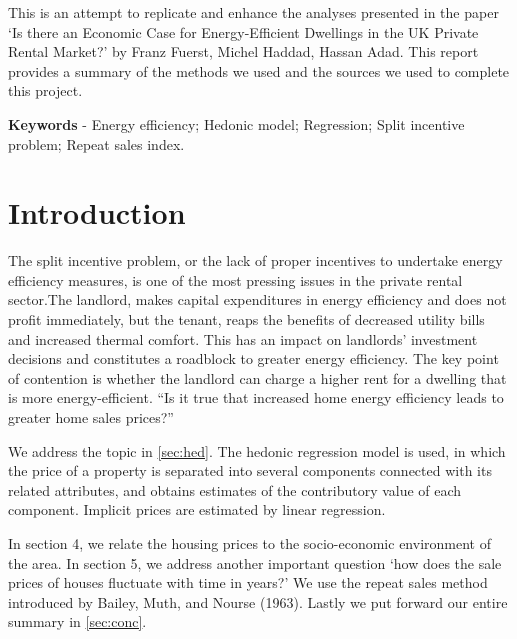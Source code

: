 \documentclass[12pt]{article}
\author{ABSTRACT}
\date{ }
\begin{document}
\setlength{\headheight}{14.49998pt}

\newpage

\maketitle

This is an attempt to replicate and enhance the analyses presented in the paper `Is there an Economic Case for Energy-Efficient Dwellings in the UK Private Rental Market?' by Franz Fuerst, Michel Haddad, Hassan Adad. This report provides a summary of the methods we used and the sources we used to complete this project.

\textbf{Keywords} - Energy efficiency; Hedonic model; Regression; Split incentive problem; Repeat sales index.
\newpage
\tableofcontents
\newpage
\section{Introduction}
The split incentive problem, or the lack of proper incentives to undertake energy efficiency measures, is one of the most pressing issues in the private rental sector.The landlord, makes capital expenditures in energy efficiency and does not profit immediately, but the tenant, reaps the benefits of decreased utility bills and increased thermal comfort. This has an impact on landlords' investment decisions and constitutes a roadblock to greater energy efficiency. The key point of contention is whether the landlord can charge a higher rent for a dwelling that is more energy-efficient. ``Is it true that increased home energy efficiency leads to greater home sales prices?''

We address the topic in \autoref{sec:hed}. The hedonic regression model is used, in which the price of a property is separated into several components connected with its related attributes, and obtains estimates of the contributory value of each component. Implicit prices are estimated by linear regression.

In section 4, we relate the housing prices to the socio-economic environment of the area. In section 5, we address another important question `how does the sale prices of houses fluctuate with time in years?' We use the repeat sales method introduced by Bailey, Muth, and Nourse (1963). Lastly we put forward our entire summary in \autoref{sec:conc}.
\end{document}
